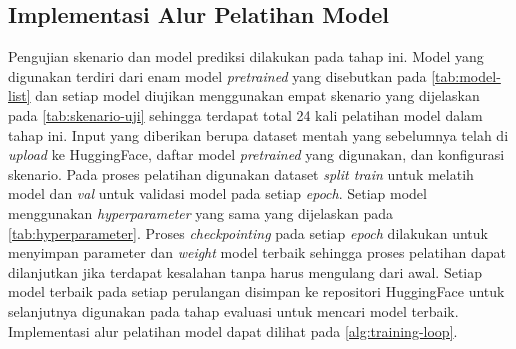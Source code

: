 \subsection{Implementasi Alur Pelatihan Model}

Pengujian skenario dan model prediksi dilakukan pada tahap ini. Model yang digunakan terdiri dari enam model \textit{pretrained} yang disebutkan pada \autoref{tab:model-list} dan setiap model diujikan menggunakan empat skenario yang dijelaskan pada \autoref{tab:skenario-uji} sehingga terdapat total 24 kali pelatihan model dalam tahap ini. Input yang diberikan berupa dataset mentah yang sebelumnya telah di \textit{upload} ke HuggingFace, daftar model \textit{pretrained} yang digunakan, dan konfigurasi skenario. Pada proses pelatihan digunakan dataset \textit{split train} untuk melatih model dan \textit{val} untuk validasi model pada setiap \textit{epoch}. Setiap model menggunakan \textit{hyperparameter} yang sama yang dijelaskan pada \autoref{tab:hyperparameter}. Proses \textit{checkpointing} pada setiap \textit{epoch} dilakukan untuk menyimpan parameter dan \textit{weight} model terbaik sehingga proses pelatihan dapat dilanjutkan jika terdapat kesalahan tanpa harus mengulang dari awal. Setiap model terbaik pada setiap perulangan disimpan ke repositori HuggingFace untuk selanjutnya digunakan pada tahap evaluasi untuk mencari model terbaik. Implementasi alur pelatihan model dapat dilihat pada \autoref{alg:training-loop}.      

